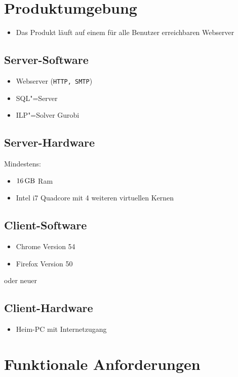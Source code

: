\documentclass[parskip=full]{scrartcl}
\begin{document}
\section{Produktumgebung}

\begin{itemize} 
  \item Das Produkt läuft auf einem für alle Benutzer erreichbaren Webserver
\end{itemize}
\subsection{Server-Software}
\begin{itemize} 
  \item Webserver (\texttt{HTTP, SMTP})
  \item SQL"=Server
  \item ILP"=Solver Gurobi %
\end{itemize}
\subsection{Server-Hardware}
Mindestens:
\begin{itemize} 
  \item $\SI{16}{\giga\byte}$ Ram
  \item Intel i7 Quadcore mit 4 weiteren virtuellen Kernen 
\end{itemize}

\subsection{Client-Software}
\begin{itemize}
  \item Chrome Version 54
  \item Firefox Version 50
\end{itemize}
oder neuer
\subsection{Client-Hardware}
\begin{itemize}
  \item Heim-PC mit Internetzugang %
\end{itemize}

\section{Funktionale Anforderungen}
\end{document}
